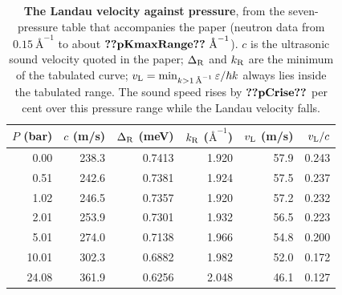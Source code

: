 \begin{table}[tp]\centering\small
\begin{tabular}{rrrrrr}\toprule
$P$ (bar) & $c$ (m/s) & $\Delta_{\rm R}$ (meV) & $k_{\rm R}$ ($\text{\AA}^{-1}$) & $v_{\rm L}$ (m/s) & $v_{\rm L}/c$ \\\midrule
0.00 & 238.3 & 0.7413 & 1.920 & 57.9 & 0.243 \\
0.51 & 242.6 & 0.7381 & 1.924 & 57.5 & 0.237 \\
1.02 & 246.5 & 0.7357 & 1.920 & 57.2 & 0.232 \\
2.01 & 253.9 & 0.7301 & 1.932 & 56.5 & 0.223 \\
5.01 & 274.0 & 0.7138 & 1.966 & 54.8 & 0.200 \\
10.01 & 302.3 & 0.6882 & 1.982 & 52.0 & 0.172 \\
24.08 & 361.9 & 0.6256 & 2.048 & 46.1 & 0.127 \\
\bottomrule\end{tabular}
\caption{\textbf{The Landau velocity against pressure}, from the seven-pressure table that accompanies the paper (neutron data from $0.15\ \text{\AA}^{-1}$ to about $\cfiveV{pKmaxRange}\ \text{\AA}^{-1}$). $c$ is the ultrasonic sound velocity quoted in the paper; $\Delta_{\rm R}$ and $k_{\rm R}$ are the minimum of the tabulated curve; $v_{\rm L}=\min_{k>1\,\text{\AA}^{-1}}\varepsilon/\hbar k$ always lies inside the tabulated range. The sound speed rises by $\cfiveV{pCrise}$ per cent over this pressure range while the Landau velocity falls.}\label{ch05:tab-pressure}
\end{table}
